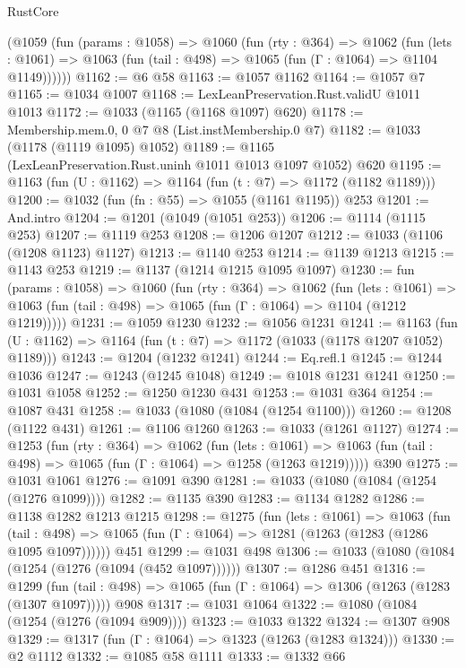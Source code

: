 \begin{lexlean}{RustCore}
\begin{coremodule}
    (@1059
      (fun (params : @1058) =>
      @1060
        (fun (rty : @364) =>
        @1062
          (fun (lets : @1061) =>
          @1063 (fun (tail : @498) => @1065 (fun (Γ : @1064) => @1104 @1149))))))
@1162 := @6 @58
@1163 := @1057 @1162
@1164 := @1057 @7
@1165 := @1034 @1007
@1168 := LexLeanPreservation.Rust.validU @1011 @1013
@1172 := @1033 (@1165 (@1168 @1097) @620)
@1178 := Membership.mem.{0, 0} @7 @8 (List.instMembership.{0} @7)
@1182 := @1033 (@1178 (@1119 @1095) @1052)
@1189 := @1165 (LexLeanPreservation.Rust.uninh @1011 @1013 @1097 @1052) @620
@1195 := @1163 (fun (U : @1162) => @1164 (fun (t : @7) => @1172 (@1182 @1189)))
@1200 := @1032 (fun (fn : @55) => @1055 (@1161 @1195)) @253
@1201 := And.intro
@1204 := @1201 (@1049 (@1051 @253))
@1206 := @1114 (@1115 @253)
@1207 := @1119 @253
@1208 := @1206 @1207
@1212 := @1033 (@1106 (@1208 @1123) @1127)
@1213 := @1140 @253
@1214 := @1139 @1213
@1215 := @1143 @253
@1219 := @1137 (@1214 @1215 @1095 @1097)
@1230 := fun (params : @1058) =>
  @1060
    (fun (rty : @364) =>
    @1062
      (fun (lets : @1061) =>
      @1063 (fun (tail : @498) => @1065 (fun (Γ : @1064) => @1104 (@1212 @1219)))))
@1231 := @1059 @1230
@1232 := @1056 @1231
@1241 := @1163 (fun (U : @1162) => @1164 (fun (t : @7) => @1172 (@1033 (@1178 @1207 @1052) @1189)))
@1243 := @1204 (@1232 @1241)
@1244 := Eq.refl.{1}
@1245 := @1244 @1036
@1247 := @1243 (@1245 @1048)
@1249 := @1018 @1231 @1241
@1250 := @1031 @1058
@1252 := @1250 @1230 @431
@1253 := @1031 @364
@1254 := @1087 @431
@1258 := @1033 (@1080 (@1084 (@1254 @1100)))
@1260 := @1208 (@1122 @431)
@1261 := @1106 @1260
@1263 := @1033 (@1261 @1127)
@1274 := @1253
    (fun (rty : @364) =>
    @1062
      (fun (lets : @1061) =>
      @1063 (fun (tail : @498) => @1065 (fun (Γ : @1064) => @1258 (@1263 @1219)))))
    @390
@1275 := @1031 @1061
@1276 := @1091 @390
@1281 := @1033 (@1080 (@1084 (@1254 (@1276 @1099))))
@1282 := @1135 @390
@1283 := @1134 @1282
@1286 := @1138 @1282 @1213 @1215
@1298 := @1275
    (fun (lets : @1061) =>
    @1063
      (fun (tail : @498) => @1065 (fun (Γ : @1064) => @1281 (@1263 (@1283 (@1286 @1095 @1097))))))
    @451
@1299 := @1031 @498
@1306 := @1033 (@1080 (@1084 (@1254 (@1276 (@1094 (@452 @1097))))))
@1307 := @1286 @451
@1316 := @1299
    (fun (tail : @498) => @1065 (fun (Γ : @1064) => @1306 (@1263 (@1283 (@1307 @1097)))))
    @908
@1317 := @1031 @1064
@1322 := @1080 (@1084 (@1254 (@1276 (@1094 @909))))
@1323 := @1033 @1322
@1324 := @1307 @908
@1329 := @1317 (fun (Γ : @1064) => @1323 (@1263 (@1283 @1324)))
@1330 := @2 @1112
@1332 := @1085 @58 @1111
@1333 := @1332 @66

\end{coremodule}
\end{lexlean}
